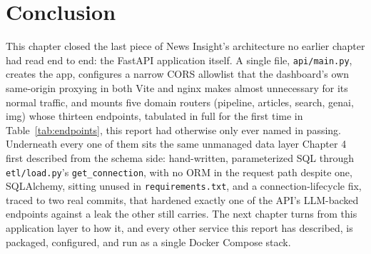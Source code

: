 \section{Conclusion}
\begin{sloppypar}
This chapter closed the last piece of News Insight's architecture no earlier chapter had read end to end: the FastAPI application itself. A single file, \texttt{api/\allowbreak main.py}, creates the app, configures a narrow CORS allowlist that the dashboard's own same-origin proxying in both Vite and nginx makes almost unnecessary for its normal traffic, and mounts five domain routers (pipeline, articles, search, genai, img) whose thirteen endpoints, tabulated in full for the first time in Table~\ref{tab:endpoints}, this report had otherwise only ever named in passing. Underneath every one of them sits the same unmanaged data layer Chapter 4 first described from the schema side: hand-written, parameterized SQL through \texttt{etl/\allowbreak load.py}'s \texttt{get\_connection}, with no ORM in the request path despite one, SQLAlchemy, sitting unused in \texttt{requirements.txt}, and a connection-lifecycle fix, traced to two real commits, that hardened exactly one of the API's LLM-backed endpoints against a leak the other still carries. The next chapter turns from this application layer to how it, and every other service this report has described, is packaged, configured, and run as a single Docker Compose stack.
\end{sloppypar}
